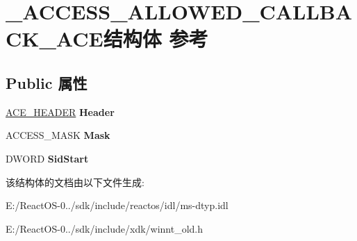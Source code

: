 \hypertarget{struct___a_c_c_e_s_s___a_l_l_o_w_e_d___c_a_l_l_b_a_c_k___a_c_e}{}\section{\+\_\+\+A\+C\+C\+E\+S\+S\+\_\+\+A\+L\+L\+O\+W\+E\+D\+\_\+\+C\+A\+L\+L\+B\+A\+C\+K\+\_\+\+A\+C\+E结构体 参考}
\label{struct___a_c_c_e_s_s___a_l_l_o_w_e_d___c_a_l_l_b_a_c_k___a_c_e}
\subsection*{Public 属性}
\begin{DoxyCompactItemize}
\item 
\mbox{\label{struct___a_c_c_e_s_s___a_l_l_o_w_e_d___c_a_l_l_b_a_c_k___a_c_e_a7718cc49c6ce326e69d1fd5dc33d178f}} 
\hyperlink{struct___a_c_e___h_e_a_d_e_r}{A\+C\+E\+\_\+\+H\+E\+A\+D\+ER} {\bfseries Header}
\item 
\mbox{\label{struct___a_c_c_e_s_s___a_l_l_o_w_e_d___c_a_l_l_b_a_c_k___a_c_e_ab43cfaf31fae8c0c232f470a81cb1c7c}} 
A\+C\+C\+E\+S\+S\+\_\+\+M\+A\+SK {\bfseries Mask}
\item 
\mbox{\label{struct___a_c_c_e_s_s___a_l_l_o_w_e_d___c_a_l_l_b_a_c_k___a_c_e_acbbb76a4242a3c0e0883de91e7ca2a57}} 
D\+W\+O\+RD {\bfseries Sid\+Start}
\end{DoxyCompactItemize}


该结构体的文档由以下文件生成\+:\begin{DoxyCompactItemize}
\item 
E\+:/\+React\+O\+S-\/0../sdk/include/reactos/idl/ms-\/dtyp.\+idl\item 
E\+:/\+React\+O\+S-\/0../sdk/include/xdk/winnt\+\_\+old.\+h\end{DoxyCompactItemize}
